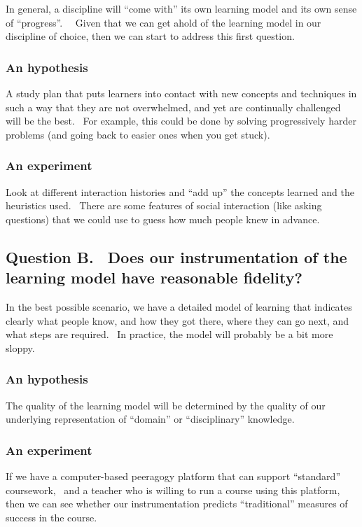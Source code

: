In general, a discipline will ``come with'' its own learning model and
its own sense of ``progress''.~~ Given that we can get ahold of the
learning model in our discipline of choice, then we can start to address
this first question.

\subsubsection{An hypothesis}

A study plan that puts learners into contact with new concepts and
techniques in such a way that they are not overwhelmed, and yet are
continually challenged will be the best. ~For example, this could be
done by solving progressively harder problems (and going back to easier
ones when you get stuck).

\subsubsection{An experiment}

Look at different interaction histories and ``add up'' the concepts
learned and the heuristics used. ~There are some features of social
interaction (like asking questions) that we could use to guess how much
people knew in advance.

\subsection{Question B.~ Does our instrumentation of the learning model
have reasonable fidelity?}

In the best possible scenario, we have a detailed model of learning that
indicates clearly what people know, and how they got there, where they
can go next, and what steps are required.~ In practice, the model will
probably be a bit more sloppy.

\subsubsection{An hypothesis}

The quality of the learning model will be determined by the quality of
our underlying representation of ``domain'' or ``disciplinary''
knowledge.

\subsubsection{\textbf{An experiment}}

If we have a computer-based peeragogy platform that can support
``standard'' coursework, ~and a teacher who is willing to run a course
using this platform, then we can see whether our instrumentation
predicts ``traditional'' measures of success in the course.

